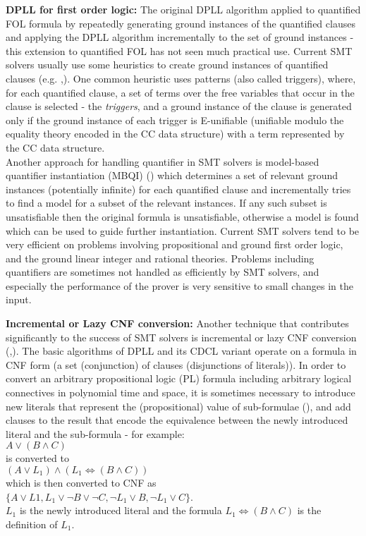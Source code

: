 \textbf{DPLL for first order logic:}
The original DPLL algorithm applied to quantified FOL formula by repeatedly generating ground instances of the quantified clauses and applying the DPLL algorithm incrementally to the set of ground instances - this extension to quantified FOL has not seen much practical use. Current SMT solvers usually use some heuristics to create ground instances of quantified clauses (e.g. \cite{DBLP:conf/cade/ReynoldsTGKDB13},\cite{DBLP:conf/cav/GeM09}). One common heuristic uses patterns (also called triggers), where, for each quantified clause, a set of terms over the free variables that occur in the clause is selected - the \textit{triggers}, and a ground instance of the clause is generated only if the ground instance of each trigger is E-unifiable (unifiable modulo the equality theory encoded in the CC data structure) with a term represented by the CC data structure.\\
Another approach for handling quantifier in SMT solvers is model-based quantifier instantiation (MBQI) (\cite{DBLP:conf/cav/GeM09}) which determines a set of relevant ground instances (potentially infinite) for each quantified clause and incrementally tries to find a model for a subset of the relevant instances.
If any such subset is unsatisfiable then the original formula is unsatisfiable, otherwise a model is found which can be used to guide further instantiation. 
Current SMT solvers tend to be very efficient on problems involving propositional and ground first order logic, and the ground linear integer and rational theories. Problems including quantifiers are sometimes not handled as efficiently by SMT solvers, and especially the performance of the prover is very sensitive to small changes in the input. 

\textbf{Incremental or Lazy CNF conversion:}
Another technique that contributes significantly to the success of SMT solvers is incremental or lazy CNF conversion (\cite{demoura2007relevancy},\cite{Detlefs:2005:STP:1066100.1066102}).
The basic algorithms of DPLL and its CDCL variant operate on a formula in CNF form (a set (conjunction) of clauses (disjunctions of literals)). In order to convert an arbitrary propositional logic (PL) formula including arbitrary logical connectives in polynomial time and space, it is sometimes necessary to introduce new literals that represent the (propositional) value of sub-formulae (\cite{Baaz2001273}), and add clauses to the result that encode the equivalence between the newly introduced literal and the sub-formula - for example: \\
$A \lor (B \land C)$ \\
is converted to\\
$(A \lor L_1) \land (L_1 \Leftrightarrow (B \land C))$\\
which is then converted to CNF as\\
$\{A \lor L1, L_1 \lor \lnot B \lor \lnot C, \lnot L_1 \lor B, \lnot L_1 \lor C\}$.\\
$L_1$ is the newly introduced literal and the formula $L_1 \Leftrightarrow (B \land C)$ is the definition of $L_1$.

